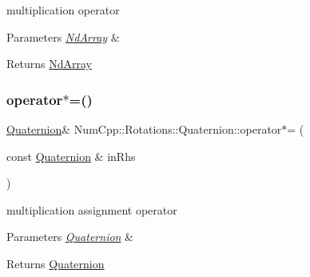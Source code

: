 multiplication operator


\begin{DoxyParams}{Parameters}
{\em \mbox{\hyperlink{class_num_cpp_1_1_nd_array}{Nd\+Array}}} & \\
\hline
\end{DoxyParams}
\begin{DoxyReturn}{Returns}
\mbox{\hyperlink{class_num_cpp_1_1_nd_array}{Nd\+Array}} 
\end{DoxyReturn}
\mbox{\label{class_num_cpp_1_1_rotations_1_1_quaternion_a51b3dad20f0d2aa541a2d2890a9aca5b}} 
\subsubsection{\texorpdfstring{operator$\ast$=()}{operator*=()}\hspace{0.1cm}{\footnotesize\ttfamily [1/2]}}
{\footnotesize\ttfamily \mbox{\hyperlink{class_num_cpp_1_1_rotations_1_1_quaternion}{Quaternion}}\& Num\+Cpp\+::\+Rotations\+::\+Quaternion\+::operator$\ast$= (\begin{DoxyParamCaption}\item[{const \mbox{\hyperlink{class_num_cpp_1_1_rotations_1_1_quaternion}{Quaternion}} \&}]{in\+Rhs }\end{DoxyParamCaption})\hspace{0.3cm}{\ttfamily [inline]}}

multiplication assignment operator


\begin{DoxyParams}{Parameters}
{\em \mbox{\hyperlink{class_num_cpp_1_1_rotations_1_1_quaternion}{Quaternion}}} & \\
\hline
\end{DoxyParams}
\begin{DoxyReturn}{Returns}
\mbox{\hyperlink{class_num_cpp_1_1_rotations_1_1_quaternion}{Quaternion}} 
\end{DoxyReturn}
\mbox{\label{class_num_cpp_1_1_rotations_1_1_quaternion_aa21c32b9337ccd120413593048cd890a}} 
